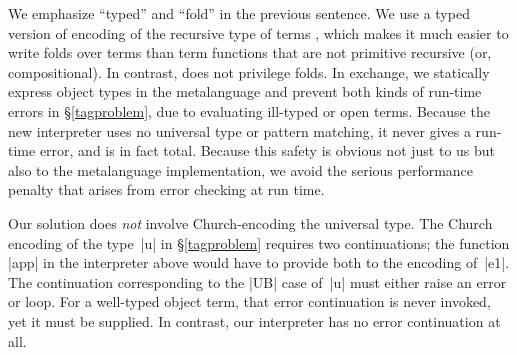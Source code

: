 We emphasize ``typed'' and ``fold'' in the previous sentence.
We use a typed version of 
encoding of the recursive type of terms \citep{bohm-automatic}, which
makes it much easier to write folds over terms than term functions
that are not primitive recursive (or, compositional).
In contrast, \citet{JFP-Mogensen} does not privilege folds.
In exchange, we statically express object types in the metalanguage
and prevent both kinds of run-time errors in
\S\ref{tagproblem}, due to evaluating ill-typed or open terms.
Because the new interpreter
uses no universal type or pattern matching, it never gives a
run-time error, and is in fact total.  Because this safety is obvious
not just to us but also to the metalanguage implementation, we avoid
the serious performance penalty \citep{WalidICFP02}
that arises from error checking at run time.

Our solution does \emph{not} involve Church-encoding the
universal type. The Church encoding of the type~|u| in \S\ref{tagproblem}
requires two continuations; the function |app| in the interpreter above would
have to provide both to the encoding of~|e1|. The continuation
corresponding to the |UB| case of~|u| must either raise an error or
loop. For a well-typed object term, that error continuation is never
invoked, yet it must be supplied. In contrast, our interpreter has no error
continuation at all.

